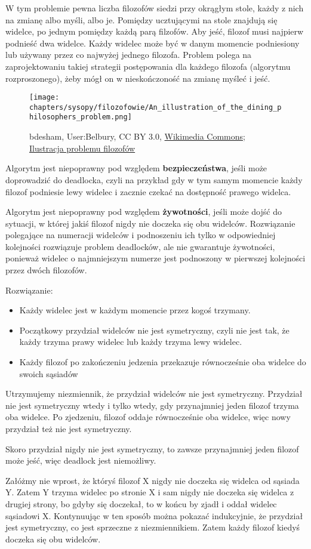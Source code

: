 W tym problemie pewna liczba filozofów siedzi przy okrągłym stole, każdy z nich na zmianę albo myśli, albo je. Pomiędzy ucztującymi na stole znajdują się widelce, po jednym pomiędzy każdą parą filzofów. Aby jeść, filozof musi najpierw podnieść dwa widelce. Każdy widelec może być w danym momencie podniesiony lub używany przez co najwyżej jednego filozofa. Problem polega na zaprojektowaniu takiej strategii postępowania dla każdego filozofa (algorytmu rozproszonego), żeby mógł on w nieskończoność na zmianę myśleć i jeść.

\begin{figure}[H]  
    \centering
    \texttt{[image: chapters/sysopy/filozofowie/An\_illustration\_of\_the\_dining\_philosophers\_problem.png]}
\caption{bdesham, User:Belbury, CC BY 3.0, \href{https://creativecommons.org/licenses/by/3.0}{Wikimedia Commons; Ilustracja problemu filozofów}}
\end{figure}

Algorytm jest niepoprawny pod względem \textbf{bezpieczeństwa}, jeśli może doprowadzić do deadlocka, czyli na przykład gdy w tym samym momencie każdy filozof podniesie lewy widelec i zacznie czekać na dostępność prawego widelca. 

Algorytm jest niepoprawny pod względem \textbf{żywotności}, jeśli może dojść do sytuacji, w której jakiś filozof nigdy nie doczeka się obu widelców. Rozwiązanie polegające na numeracji widelców i podnoszeniu ich tylko w odpowiedniej kolejności rozwiązuje problem deadlocków, ale nie gwarantuje żywotności, ponieważ widelec o najmniejszym numerze jest podnoszony w pierwszej kolejności przez dwóch filozofów.

Rozwiązanie:
\begin{itemize}
\item Każdy widelec jest w każdym momencie przez kogoś trzymany.
\item Początkowy przydział widelców nie jest symetryczny, czyli nie jest tak, że każdy trzyma prawy widelec lub każdy trzyma lewy widelec.
\item Każdy filozof po zakończeniu jedzenia przekazuje równocześnie oba widelce do swoich sąsiadów
\end{itemize}

Utrzymujemy niezmiennik, że przydział widelców nie jest symetryczny. Przydział nie jest symetryczny wtedy i tylko wtedy, gdy przynajmniej jeden filozof trzyma oba widelce. Po zjedzeniu, filozof oddaje równocześnie oba widelce, więc nowy przydział też nie jest symetryczny.

Skoro przydział nigdy nie jest symetryczny, to zawsze przynajmniej jeden filozof może jeść, więc deadlock jest niemożliwy.

Załóżmy nie wprost, że któryś filozof X nigdy nie doczeka się widelca od sąsiada Y. Zatem Y trzyma widelec po stronie X i sam nigdy nie doczeka się widelca z drugiej strony, bo gdyby się doczekał, to w końcu by zjadł i oddał widelec sąsiadowi X. Kontynuując w ten sposób można pokazać indukcyjnie, że przydział jest symetryczny, co jest sprzeczne z niezmiennikiem. Zatem każdy filozof kiedyś doczeka się obu widelców.